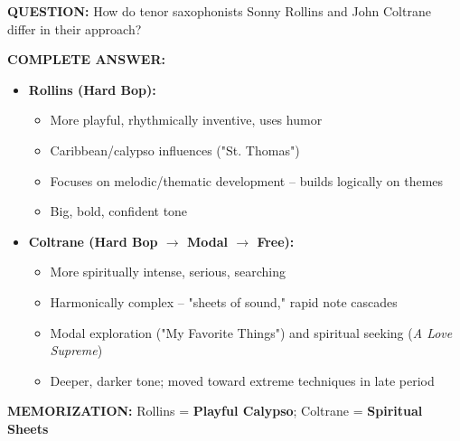 \documentclass[11pt]{article}
\begin{document}
\begin{mdframed}[backgroundcolor=questioncolor!10, linewidth=2pt]
\textbf{\textcolor{questioncolor}{QUESTION:}} How do tenor saxophonists Sonny Rollins and John Coltrane differ in their approach?
\end{mdframed}

\begin{mdframed}[backgroundcolor=answercolor!10, linewidth=2pt]
\textbf{\textcolor{answercolor}{COMPLETE ANSWER:}}

\begin{itemize}[leftmargin=*, nosep]
    \item \textbf{Rollins (Hard Bop):}
    \begin{itemize}[nosep]
        \item More playful, rhythmically inventive, uses humor
        \item Caribbean/calypso influences ("St. Thomas")
        \item Focuses on melodic/thematic development – builds logically on themes
        \item Big, bold, confident tone
    \end{itemize}
    
    \item \textbf{Coltrane (Hard Bop $\rightarrow$ Modal $\rightarrow$ Free):}
    \begin{itemize}[nosep]
        \item More spiritually intense, serious, searching
        \item Harmonically complex – "sheets of sound," rapid note cascades
        \item Modal exploration ("My Favorite Things") and spiritual seeking (\textit{A Love Supreme})
        \item Deeper, darker tone; moved toward extreme techniques in late period
    \end{itemize}
\end{itemize}

\vspace{5pt}
\end{mdframed}

\textbf{MEMORIZATION:} Rollins = \textbf{Playful Calypso}; Coltrane = \textbf{Spiritual Sheets}
\end{document}
